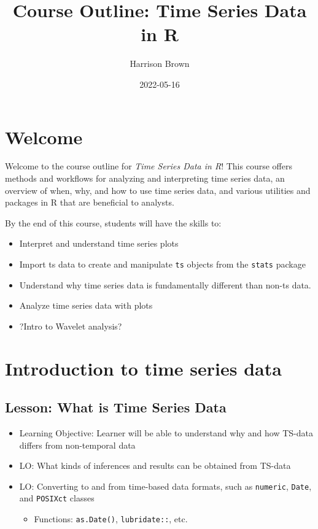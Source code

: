 \documentclass[
]{book}
\title{Course Outline: Time Series Data in R}
\author{Harrison Brown}
\date{2022-05-16}
\providecommand{\tightlist}{%
  \setlength{\itemsep}{0pt}\setlength{\parskip}{0pt}}
\begin{document}
\maketitle

{
\setcounter{tocdepth}{1}
\tableofcontents
}
\hypertarget{welcome}{%
\chapter*{Welcome}\label{welcome}}

Welcome to the course outline for \emph{Time Series Data in R}! This course offers methods and workflows for analyzing and interpreting time series data, an overview of when, why, and how to use time series data, and various utilities and packages in R that are beneficial to analysts.

By the end of this course, students will have the skills to:

\begin{itemize}
\tightlist
\item
  Interpret and understand time series plots
\item
  Import ts data to create and manipulate \texttt{ts} objects from the \texttt{stats} package
\item
  Understand why time series data is fundamentally different than non-ts data.
\item
  Analyze time series data with plots
\item
  ?Intro to Wavelet analysis?
\end{itemize}

\hypertarget{introduction-to-time-series-data}{%
\chapter{Introduction to time series data}\label{introduction-to-time-series-data}}

\hypertarget{lesson-what-is-time-series-data}{%
\section{Lesson: What is Time Series Data}\label{lesson-what-is-time-series-data}}

\begin{itemize}
\tightlist
\item
  Learning Objective: Learner will be able to understand why and how TS-data differs from non-temporal data
\item
  LO: What kinds of inferences and results can be obtained from TS-data
\item
  LO: Converting to and from time-based data formats, such as \texttt{numeric}, \texttt{Date}, and \texttt{POSIXct} classes

  \begin{itemize}
  \tightlist
  \item
    Functions: \texttt{as.Date()}, \texttt{lubridate::}, etc.
  \end{itemize}
\end{itemize}
\end{document}

